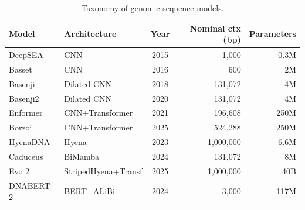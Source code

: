\begin{table}[t]
\centering
\caption{Taxonomy of genomic sequence models.}
\label{tab:model_taxonomy}
\begin{tabular}{llcrr}
\toprule
Model & Architecture & Year & Nominal ctx (bp) & Parameters \\
\midrule
DeepSEA & CNN & 2015 & 1,000 & ~0.3M \\
Basset & CNN & 2016 & 600 & ~2M \\
Basenji & Dilated CNN & 2018 & 131,072 & ~4M \\
Basenji2 & Dilated CNN & 2020 & 131,072 & ~4M \\
Enformer & CNN+Transformer & 2021 & 196,608 & ~250M \\
Borzoi & CNN+Transformer & 2025 & 524,288 & ~250M \\
HyenaDNA & Hyena & 2023 & 1,000,000 & ~6.6M \\
Caduceus & BiMamba & 2024 & 131,072 & ~8M \\
Evo 2 & StripedHyena+Transf & 2025 & 1,000,000 & 40B \\
DNABERT-2 & BERT+ALiBi & 2024 & 3,000 & 117M \\
\bottomrule
\end{tabular}
\end{table}